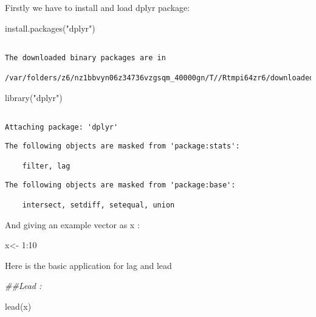 \documentclass[
  letterpaper,
  DIV=11,
  numbers=noendperiod]{scrreprt}
\newenvironment{Shaded}{\begin{snugshade}}{\end{snugshade}}
\newcommand{\DecValTok}[1]{\textcolor[rgb]{0.68,0.00,0.00}{#1}}
\newcommand{\DocumentationTok}[1]{\textcolor[rgb]{0.37,0.37,0.37}{\textit{#1}}}
\newcommand{\FunctionTok}[1]{\textcolor[rgb]{0.28,0.35,0.67}{#1}}
\newcommand{\NormalTok}[1]{\textcolor[rgb]{0.00,0.23,0.31}{#1}}
\newcommand{\OtherTok}[1]{\textcolor[rgb]{0.00,0.23,0.31}{#1}}
\newcommand{\SpecialCharTok}[1]{\textcolor[rgb]{0.37,0.37,0.37}{#1}}
\newcommand{\StringTok}[1]{\textcolor[rgb]{0.13,0.47,0.30}{#1}}
\begin{document}
Firstly we have to install and load dplyr package:

\begin{Shaded}
\begin{Highlighting}[]
\FunctionTok{install.packages}\NormalTok{(}\StringTok{"dplyr"}\NormalTok{)       }
\end{Highlighting}
\end{Shaded}

\begin{verbatim}

The downloaded binary packages are in
    /var/folders/z6/nz1bbvyn06z34736vzgsqm_40000gn/T//Rtmpi64zr6/downloaded_packages
\end{verbatim}

\begin{Shaded}
\begin{Highlighting}[]
\FunctionTok{library}\NormalTok{(}\StringTok{"dplyr"}\NormalTok{)     }
\end{Highlighting}
\end{Shaded}

\begin{verbatim}

Attaching package: 'dplyr'
\end{verbatim}

\begin{verbatim}
The following objects are masked from 'package:stats':

    filter, lag
\end{verbatim}

\begin{verbatim}
The following objects are masked from 'package:base':

    intersect, setdiff, setequal, union
\end{verbatim}

And giving an example vector as x :

\begin{Shaded}
\begin{Highlighting}[]
\NormalTok{x}\OtherTok{\textless{}{-}} \DecValTok{1}\SpecialCharTok{:}\DecValTok{10}
\end{Highlighting}
\end{Shaded}

Here is the basic application for lag and lead

\begin{Shaded}
\begin{Highlighting}[]
\DocumentationTok{\#\#Lead :}

\FunctionTok{lead}\NormalTok{(x)}
\end{Highlighting}
\end{Shaded}
\end{document}
